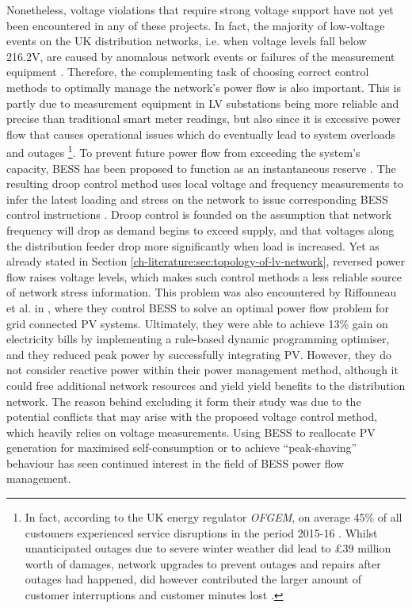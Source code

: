 Nonetheless, voltage violations that require strong voltage support have not yet been encountered in any of these projects.
In fact, the majority of low-voltage events on the UK distribution networks, i.e. when voltage levels fall below 216.2V, are caused by anomalous network events or failures of the measurement equipment \cite{UKPowerNetworks2014a}.
Therefore, the complementing task of choosing correct control methods to optimally manage the network's power flow is also important.
This is partly due to measurement equipment in LV substations being more reliable and precise than traditional smart meter readings, but also since it is excessive power flow that causes operational issues which do eventually lead to system overloads and outages \footnote{%
In fact, according to the UK energy regulator \textit{OFGEM}, on average 45\% of all customers experienced service disruptions in the period 2015-16 \cite{Ofgem2017}.
Whilst unanticipated outages due to severe winter weather did lead to \pounds39 million worth of damages, network upgrades to prevent outages and repairs after outages had happened, did however contributed the larger amount of customer interruptions and customer minutes lost \cite{Ofgem2014}.%
}\cite{Putrus2009, Pillai2010}.
To prevent future power flow from exceeding the system's capacity, BESS has been proposed to function as an instantaneous reserve \cite{Kunisch1986a, Kunisch1986}.
The resulting droop control method uses local voltage and frequency measurements to infer the latest loading and stress on the network to issue corresponding BESS control instructions \cite{Engler2005a}.
Droop control is founded on the assumption that network frequency will drop as demand begins to exceed supply, and that voltages along the distribution feeder drop more significantly when load is increased.
Yet as already stated in Section \ref{ch-literature:sec:topology-of-lv-network}, reversed power flow raises voltage levels, which makes such control methods a less reliable source of network stress information.
This problem was also encountered by Riffonneau et al. in \cite{Riffonneau2011}, where they control BESS to solve an optimal power flow problem for grid connected PV systems.
Ultimately, they were able to achieve 13\% gain on electricity bills by implementing a rule-based dynamic programming optimiser, and they reduced peak power by successfully integrating PV.
However, they do not consider reactive power within their power management method, although it could free additional network resources and yield  yield benefits to the distribution network.
The reason behind excluding it form their study was due to the potential conflicts that may arise with the proposed voltage control method, which heavily relies on voltage measurements.
Using BESS to reallocate PV generation for maximised self-consumption \cite{SaniHassan2017} or to achieve ``peak-shaving'' behaviour \cite{Bennett2015, DePaola2016} has seen continued interest in the field of BESS power flow management.

